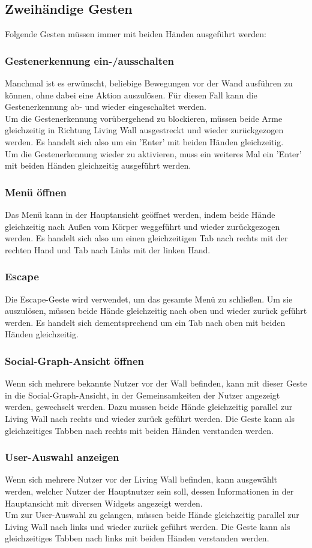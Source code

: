 \documentclass[10pt,a4paper]{report}
\begin{document}
		\subsection{Zweihändige Gesten}
		Folgende Gesten müssen immer mit beiden Händen ausgeführt werden:
		\subsubsection{Gestenerkennung ein-/ausschalten}
		Manchmal ist es erwünscht, beliebige Bewegungen vor der Wand ausführen zu können, ohne dabei eine Aktion auszulösen. Für diesen Fall kann die Gestenerkennung ab- und wieder eingeschaltet werden. \\
Um die Gestenerkennung vorübergehend zu blockieren, müssen beide Arme gleichzeitig in Richtung Living Wall ausgestreckt und wieder zurückgezogen werden. Es handelt sich also um ein 'Enter' mit beiden Händen gleichzeitig.\\
Um die Gestenerkennung wieder zu aktivieren, muss ein weiteres Mal ein 'Enter' mit beiden Händen gleichzeitig ausgeführt werden.
		\subsubsection{Menü öffnen}
		Das Menü kann in der Hauptansicht geöffnet werden, indem beide Hände gleichzeitig nach Außen vom Körper weggeführt und wieder zurückgezogen werden. Es handelt sich also um einen gleichzeitigen Tab nach rechts mit der rechten Hand und Tab nach Links mit der linken Hand.
		\subsubsection{Escape}
		Die Escape-Geste wird verwendet, um das gesamte Menü zu schließen. Um sie auszulösen, müssen beide Hände gleichzeitig nach oben und wieder zurück geführt werden. Es handelt sich dementsprechend um ein Tab nach oben mit beiden Händen gleichzeitig.
		\subsubsection{Social-Graph-Ansicht öffnen}
		Wenn sich mehrere bekannte Nutzer vor der Wall befinden, kann mit dieser Geste in die Social-Graph-Ansicht, in der Gemeinsamkeiten der Nutzer angezeigt werden, gewechselt werden. Dazu mussen beide Hände gleichzeitig parallel zur Living Wall nach rechts und wieder zurück geführt werden. Die Geste kann als gleichzeitiges Tabben nach rechts mit beiden Händen verstanden werden.
		\subsubsection{User-Auswahl anzeigen}
		Wenn sich mehrere Nutzer vor der Living Wall befinden, kann ausgewählt werden, welcher Nutzer der Hauptnutzer sein soll, dessen Informationen in der Hauptansicht mit diversen Widgets angezeigt werden.\\
Um zur User-Auswahl zu gelangen, müssen beide Hände gleichzeitig parallel zur Living Wall nach links und wieder zurück geführt werden. Die Geste kann als gleichzeitiges Tabben nach links mit beiden Händen verstanden werden.
\end{document}

